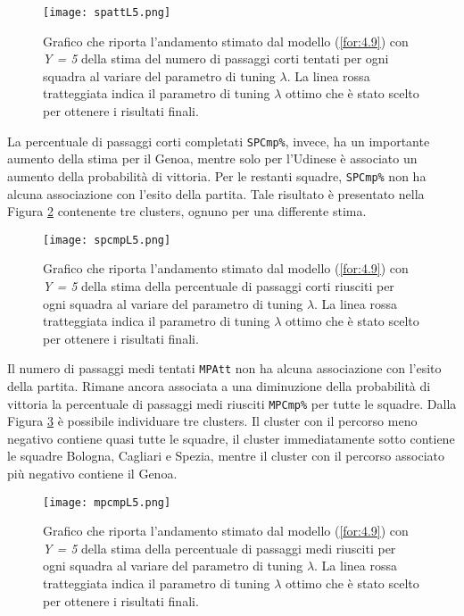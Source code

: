 \begin{figure}[htbp]
	\begin{center}
		\texttt{[image: spattL5.png]}
		\caption{Grafico che riporta l'andamento stimato dal modello (\ref{for:4.9}) con \emph{Y = 5} della stima del numero di passaggi corti tentati per ogni squadra al variare del parametro di tuning $\lambda$. La linea rossa tratteggiata indica il parametro di tuning $\lambda$ ottimo che è stato scelto per ottenere i risultati finali.} \label{fig:spattL5}
	\end{center}
\end{figure}
La percentuale di passaggi corti completati \texttt{SPCmp\%}, invece, ha un importante aumento della stima per il Genoa, mentre solo per l'Udinese è associato un aumento della probabilità di vittoria. Per le restanti squadre, \texttt{SPCmp\%} non ha alcuna associazione con l'esito della partita. Tale risultato è presentato nella Figura \ref{fig:spcmpL5} contenente tre clusters, ognuno per una differente stima.
\begin{figure}[htbp]
	\begin{center}
		\texttt{[image: spcmpL5.png]}
		\caption{Grafico che riporta l'andamento stimato dal modello (\ref{for:4.9}) con \emph{Y = 5} della stima della percentuale di passaggi corti riusciti per ogni squadra al variare del parametro di tuning $\lambda$. La linea rossa tratteggiata indica il parametro di tuning $\lambda$ ottimo che è stato scelto per ottenere i risultati finali.} \label{fig:spcmpL5}
	\end{center}
\end{figure}
Il numero di passaggi medi tentati \texttt{MPAtt} non ha alcuna associazione con l'esito della partita. Rimane ancora associata a una diminuzione della probabilità di vittoria la percentuale di passaggi medi riusciti \texttt{MPCmp\%} per tutte le squadre. Dalla Figura \ref{fig:mpcmpL5} è possibile individuare tre clusters. Il cluster con il percorso meno negativo contiene quasi tutte le squadre, il cluster immediatamente sotto contiene le squadre Bologna, Cagliari e Spezia, mentre il cluster con il percorso associato più negativo contiene il Genoa.
\begin{figure}[]
	\begin{center}
		\texttt{[image: mpcmpL5.png]}
		\caption{Grafico che riporta l'andamento stimato dal modello (\ref{for:4.9}) con \emph{Y = 5} della stima della percentuale di passaggi medi riusciti per ogni squadra al variare del parametro di tuning $\lambda$. La linea rossa tratteggiata indica il parametro di tuning $\lambda$ ottimo che è stato scelto per ottenere i risultati finali.} \label{fig:mpcmpL5}
	\end{center}
\end{figure}
